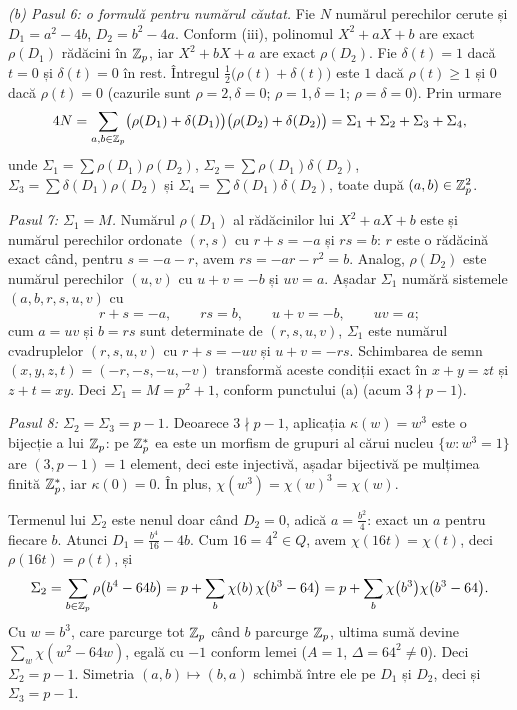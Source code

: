 \begin{solutie}
\emph{(b) Pasul 6: o formulă pentru numărul căutat.} Fie $N$ numărul perechilor cerute și $D_1 = a^2 - 4b$, $D_2 = b^2 - 4a$. Conform (iii), polinomul $X^2 + aX + b$ are exact $\rho(D_1)$ rădăcini în $\mathbb{Z}_p$, iar $X^2 + bX + a$ are exact $\rho(D_2)$. Fie $\delta(t) = 1$ dacă $t = 0$ și $\delta(t) = 0$ în rest. Întregul $\frac12\bigl(\rho(t) + \delta(t)\bigr)$ este $1$ dacă $\rho(t) \ge 1$ și $0$ dacă $\rho(t) = 0$ (cazurile sunt $\rho = 2, \delta = 0$; $\rho = 1, \delta = 1$; $\rho = \delta = 0$). Prin urmare
\[
  4N = \sum_{a, b \in \mathbb{Z}_p} \bigl(\rho(D_1) + \delta(D_1)\bigr)\bigl(\rho(D_2) + \delta(D_2)\bigr) = \Sigma_1 + \Sigma_2 + \Sigma_3 + \Sigma_4,
\]
unde $\Sigma_1 = \sum \rho(D_1)\rho(D_2)$, $\Sigma_2 = \sum \rho(D_1)\delta(D_2)$, $\Sigma_3 = \sum \delta(D_1)\rho(D_2)$ și $\Sigma_4 = \sum \delta(D_1)\delta(D_2)$, toate după $(a,b) \in \mathbb{Z}_p^2$.

\emph{Pasul 7: $\Sigma_1 = M$.} Numărul $\rho(D_1)$ al rădăcinilor lui $X^2 + aX + b$ este și numărul perechilor ordonate $(r,s)$ cu $r + s = -a$ și $rs = b$: $r$ este o rădăcină exact când, pentru $s = -a - r$, avem $rs = -ar - r^2 = b$. Analog, $\rho(D_2)$ este numărul perechilor $(u,v)$ cu $u + v = -b$ și $uv = a$. Așadar $\Sigma_1$ numără sistemele $(a,b,r,s,u,v)$ cu
\[
  r + s = -a, \qquad rs = b, \qquad u + v = -b, \qquad uv = a ;
\]
cum $a = uv$ și $b = rs$ sunt determinate de $(r,s,u,v)$, $\Sigma_1$ este numărul cvadruplelor $(r,s,u,v)$ cu $r + s = -uv$ și $u + v = -rs$. Schimbarea de semn $(x,y,z,t) = (-r,-s,-u,-v)$ transformă aceste condiții exact în $x + y = zt$ și $z + t = xy$. Deci $\Sigma_1 = M = p^2 + 1$, conform punctului (a) (acum $3 \nmid p-1$).

\emph{Pasul 8: $\Sigma_2 = \Sigma_3 = p - 1$.} Deoarece $3 \nmid p-1$, aplicația $\kappa(w) = w^3$ este o bijecție a lui $\mathbb{Z}_p$: pe $\mathbb{Z}_p^*$ ea este un morfism de grupuri al cărui nucleu $\{w : w^3 = 1\}$ are $(3, p-1) = 1$ element, deci este injectivă, așadar bijectivă pe mulțimea finită $\mathbb{Z}_p^*$, iar $\kappa(0) = 0$. În plus, $\chi(w^3) = \chi(w)^3 = \chi(w)$.

Termenul lui $\Sigma_2$ este nenul doar când $D_2 = 0$, adică $a = \frac{b^2}{4}$: exact un $a$ pentru fiecare $b$. Atunci $D_1 = \frac{b^4}{16} - 4b$. Cum $16 = 4^2 \in Q$, avem $\chi(16t) = \chi(t)$, deci $\rho(16t) = \rho(t)$, și
\[
  \Sigma_2 = \sum_{b \in \mathbb{Z}_p} \rho\bigl(b^4 - 64b\bigr) = p + \sum_{b} \chi(b)\,\chi\bigl(b^3 - 64\bigr) = p + \sum_{b} \chi\bigl(b^3\bigr)\chi\bigl(b^3 - 64\bigr).
\]
Cu $w = b^3$, care parcurge tot $\mathbb{Z}_p$ când $b$ parcurge $\mathbb{Z}_p$, ultima sumă devine $\sum_{w} \chi(w^2 - 64w)$, egală cu $-1$ conform lemei ($A = 1$, $\Delta = 64^2 \neq 0$). Deci $\Sigma_2 = p - 1$. Simetria $(a,b) \mapsto (b,a)$ schimbă între ele pe $D_1$ și $D_2$, deci și $\Sigma_3 = p - 1$.


\end{solutie}
